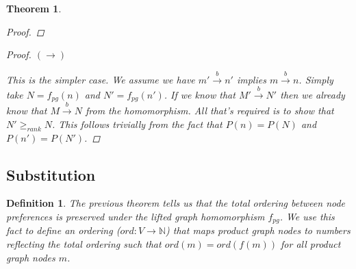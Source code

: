 \documentclass[twocolumn]{sig-alternate-10pt}
\newtheorem{thm}{Theorem}[section]
\newtheorem{defn}{Definition}
\begin{document}
\begin{thm}
\begin{proof}
  \end{proof}

  \begin{proof}
    $(\rightarrow)$

    This is the simpler case. We assume we have $m' \overset{b}{\rightarrow} n'$ implies $m \overset{b}{\rightarrow} n$.
    Simply take $N = f_{pg}(n)$ and $N' = f_{pg}(n')$. If we know that $M' \overset{b}{\rightarrow} N'$ then we already know that $M \overset{b}{\rightarrow} N$ from the homomorphism. All that's required is to show that $N' \geq_{rank} N$. This follows trivially from the fact that $P(n) = P(N)$ and $P(n') = P(N')$.
  \end{proof}

\end{thm}

\subsection{Substitution}

\begin{defn}
  The previous theorem tells us that the total ordering between node preferences is preserved under the lifted graph homomorphism $f_{pg}$. 
  We use this fact to define an ordering ($ord : V \rightarrow \mathbb{N}$) that maps product graph nodes to numbers reflecting the total ordering such that $ord(m) = ord(f(m))$ for all product graph nodes $m$.
\end{defn} 
\end{document}
